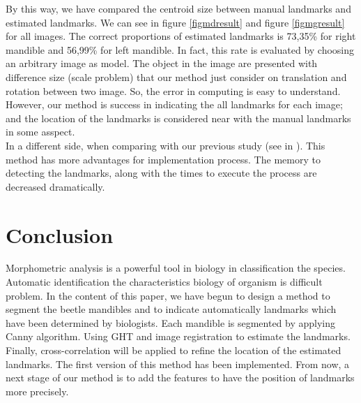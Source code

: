\documentclass[twoside,twocolumn,10pt]{article}
\begin{document}
By this way, we have compared the centroid size between manual landmarks and estimated landmarks. We can see in figure \ref{figmdresult} and figure \ref{figmgresult} for all images. The correct proportions of estimated landmarks is 73,35\% for right mandible and 56,99\% for left mandible. In fact, this rate is evaluated by choosing an arbitrary image as model. The object in the image are presented with difference size (scale problem) that our method just consider on translation and rotation between two image. So, the error in computing is easy to understand. However, our method is success in indicating the all landmarks for each image; and the location of the landmarks is considered near with the manual landmarks in some asspect.\\
In a different side, when comparing with our previous study (see in \cite{est}). This method has more advantages for implementation process. The memory to detecting the landmarks, along with the times to execute the process are decreased dramatically.
\section{Conclusion}
Morphometric analysis is a powerful tool in biology in classification the species. Automatic identification the characteristics biology of organism is difficult problem. In the content of this paper, we have begun to design a method to segment the beetle mandibles and to indicate automatically landmarks which have been determined by biologists. Each mandible is segmented by applying Canny algorithm. Using GHT and image registration to estimate the landmarks. Finally, cross-correlation will be applied to refine the location of the estimated landmarks. The first version of this method has been implemented. From now, a next stage of our method is to add the features to have the position of landmarks more precisely.
%
%
\end{document}

